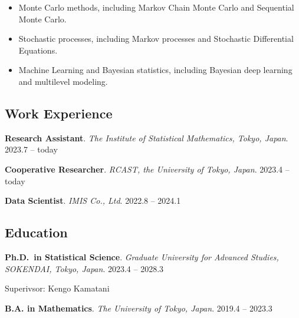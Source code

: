 \documentclass[
]{article}
\providecommand{\tightlist}{%
  \setlength{\itemsep}{0pt}\setlength{\parskip}{0pt}}\usepackage{longtable,booktabs,array}
\begin{document}
\begin{itemize}
\tightlist
\item
  Monte Carlo methods, including Markov Chain Monte Carlo and Sequential
  Monte Carlo.
\item
  Stochastic processes, including Markov processes and Stochastic
  Differential Equations.
\item
  Machine Learning and Bayesian statistics, including Bayesian deep
  learning and multilevel modeling.
\end{itemize}

\subsection{Work Experience}\label{work-experience}

\textbf{Research Assistant}. \emph{The Institute of Statistical
Mathematics, Tokyo, Japan}. \hfill {2023.7 -- today}

\textbf{Cooperative Researcher}. \emph{RCAST, the University of Tokyo,
Japan}. \hfill {2023.4 -- today}

\textbf{Data Scientist}. \emph{IMIS Co., Ltd}. \hfill {2022.8 -- 2024.1}

\subsection{Education}\label{education}

\textbf{Ph.D.~in Statistical Science}. \emph{Graduate University for
Advanced Studies, SOKENDAI, Tokyo, Japan}. \hfill {2023.4 -- 2028.3}

\par

Superivsor: Kengo Kamatani

\textbf{B.A. in Mathematics}. \emph{The University of Tokyo, Japan}.
\hfill {2019.4 -- 2023.3}
\end{document}
